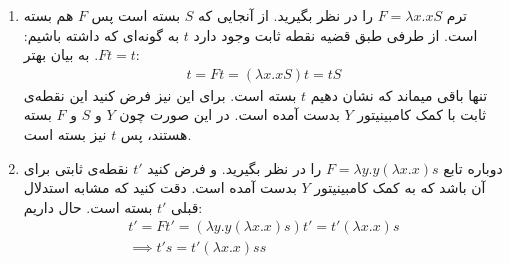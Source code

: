 \begin{enumerate}[label= \textbf{(\alph*)}]
    \item 
        ترم 
        $F = \lambda x. x S$ 
        را در نظر بگیرید. از آنجایی که  $S$ بسته است پس $F$ هم بسته است. از طرفی طبق قضیه نقطه‌ ثابت وجود دارد $t$ به گونه‌ای که داشته باشیم:
        $Ft = t$. به بیان بهتر:
        \begin{gather*}
            t = Ft = (\lambda x. x S) t = t S
        \end{gather*}
        تنها باقی میماند که نشان دهیم 
        $t$
        بسته است. برای این نیز فرض کنید این نقطه‌ی ثابت با کمک 
        کامبینیتور $Y$ بدست آمده است. 
        در این صورت چون $Y$ و $S$ و $F$ بسته هستند، پس $t$ نیز بسته است.
    \item
        دوباره تابع $F = \lambda y. y (\lambda x. x ) s$ را در نظر بگیرید. و فرض کنید $t'$ نقطه‌ی ثابتی برای آن باشد که به کمک کامبینیتور $Y$ بدست آمده است. دقت کنید که مشابه استدلال قبلی $t'$ بسته است.
        حال داریم:
        \begin{gather*}
            t' = F t' = (\lambda y . y (\lambda x. x) s) t' = t' (\lambda x . x) s \\
            \implies t's = t' (\lambda x. x) ss
        \end{gather*}
\end{enumerate}